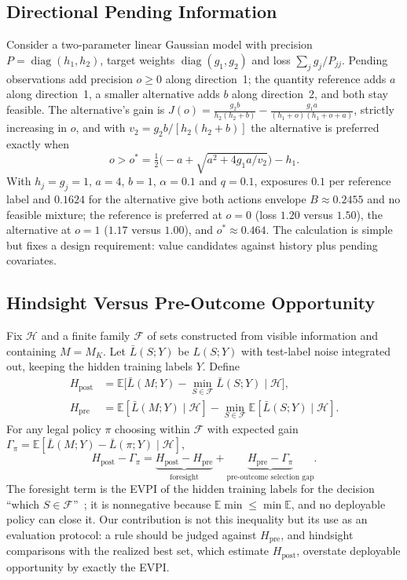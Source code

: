 \documentclass[runningheads]{llncs}
\begin{document}
\subsection{Directional Pending Information}
Consider a two-parameter linear Gaussian model with precision $P=\operatorname{diag}(h_1,h_2)$, target weights $\operatorname{diag}(g_1,g_2)$ and loss $\sum_jg_j/P_{jj}$. Pending observations add precision $o\ge0$ along direction~1; the quantity reference adds $a$ along direction~1, a smaller alternative adds $b$ along direction~2, and both stay feasible. The alternative's gain is
$J(o)=\frac{g_2b}{h_2(h_2+b)}-\frac{g_1a}{(h_1+o)(h_1+o+a)}$, strictly increasing in $o$, and with $v_2=g_2b/[h_2(h_2+b)]$ the alternative is preferred exactly when
\begin{equation}
 o>o^*=\tfrac12\big(-a+\sqrt{a^2+4g_1a/v_2}\big)-h_1 .\label{eq:threshold}
\end{equation}
With $h_j=g_j=1$, $a=4$, $b=1$, $\alpha=0.1$ and $q=0.1$, exposures $0.1$ per reference label and $0.1624$ for the alternative give both actions envelope $B\approx0.2455$ and no feasible mixture; the reference is preferred at $o=0$ (loss $1.20$ versus $1.50$), the alternative at $o=1$ ($1.17$ versus $1.00$), and $o^*\approx0.464$. The calculation is simple but fixes a design requirement: value candidates against history plus pending covariates.

\subsection{Hindsight Versus Pre-Outcome Opportunity}
\label{sec:opportunity}
Fix $\mathcal H$ and a finite family $\mathcal F$ of sets constructed from visible information and containing $M=M_K$. Let $\bar L(S;Y)$ be $L(S;Y)$ with test-label noise integrated out, keeping the hidden training labels $Y$. Define
\begin{align}
 H_{\mathrm{post}}&=\mathbb E\big[\bar L(M;Y)-\min_{S\in\mathcal F}\bar L(S;Y)\mid\mathcal H\big],\\
 H_{\mathrm{pre}}&=\mathbb E[\bar L(M;Y)\mid\mathcal H]-\min_{S\in\mathcal F}\mathbb E[\bar L(S;Y)\mid\mathcal H].
\end{align}
For any legal policy $\pi$ choosing within $\mathcal F$ with expected gain $\Gamma_\pi=\mathbb E[\bar L(M;Y)-\bar L(\pi;Y)\mid\mathcal H]$,
\begin{equation}
 H_{\mathrm{post}}-\Gamma_\pi=\underbrace{H_{\mathrm{post}}-H_{\mathrm{pre}}}_{\text{foresight}}+\underbrace{H_{\mathrm{pre}}-\Gamma_\pi}_{\text{pre-outcome selection gap}} .\label{eq:opportunity}
\end{equation}
The foresight term is the EVPI of the hidden training labels for the decision ``which $S\in\mathcal F$''~\cite{howard1966information,raiffa1961applied}; it is nonnegative because $\mathbb E\min\le\min\mathbb E$, and no deployable policy can close it. Our contribution is not this inequality but its use as an evaluation protocol: a rule should be judged against $H_{\mathrm{pre}}$, and hindsight comparisons with the realized best set, which estimate $H_{\mathrm{post}}$, overstate deployable opportunity by exactly the EVPI.
\end{document}
